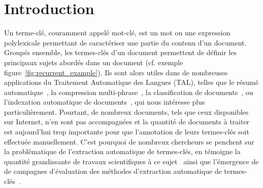 \section{Introduction}
\label{sec:introduction}
  Un terme-clé, couramment appelé mot-clé, est un mot ou une expression
  polylexicale permettant de caractériser une partie du contenu d'un document.
  Groupés ensemble, les termes-clés d'un document permettent de définir les
  principaux sujets abordés dans un document (cf. exemple
  figure~\ref{fig:recurrent_example}). Ils sont alors utiles dans de
  nombreuses applications du Traitement Automatique des Langues (TAL), telles
  que  le résumé automatique~\cite{avanzo2005keyphrase}, la compression
  multi-phrase~\cite{boudin2013multisentencecompression}, la classification de
  documents~\cite{han2007webdocumentclustering}, ou l'indexation automatique de
  documents~\cite{medelyan2008smalltrainingset}, qui nous intéresse plus
  particulièrement. Pourtant, de nombreux documents, tels que ceux disponibles
  sur Internet, n'en sont pas accompagnées et la quantité de documents à traiter
  est aujourd'hui trop importante pour que l'annotation de leurs termes-clés
  soit effectuée manuellement. C'est pourquoi de nombreux chercheurs se penchent
  sur la problématique de l'extraction automatique de termes-clés, en témoigne
  la quantité grandissante de travaux scientifiques à ce
  sujet~\cite{hasan2014state_of_the_art} ainsi que l'émergence de  de campagnes
  d'évaluation des méthodes d'extraction automatique de
  termes-clés~\cite{kim2010semeval,paroubek2012deft}.

